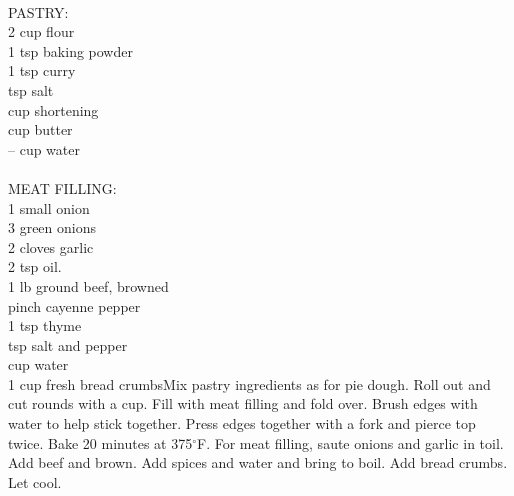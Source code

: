 \begin{minipage}{\linewidth}
\end{minipage}\par\begin{minipage}{\linewidth} 
 \\
  \step
	{PASTRY: \\
	 2 cup flour	\\
	 1 tsp baking powder	\\
	 1 tsp curry		\\
	  tsp salt	\\
	  cup shortening		\\
	  cup butter	\\
	 -- cup water	\\
	 \\MEAT FILLING: \\
	 1 small onion \\
	 3 green onions \\
	 2 cloves garlic \\
	 2 tsp oil. \\
   1 lb ground beef, browned	 \\
	 pinch cayenne pepper \\
	 1 tsp thyme	 \\
	  tsp salt and pepper \\
	  cup water \\
	 1 cup fresh bread crumbs}{Mix pastry ingredients as for pie dough. Roll out and cut rounds with a cup. Fill with meat filling and fold over. Brush edges with water to help stick together. Press edges together with a fork and pierce top twice. Bake 20 minutes at 375$^\circ$F. For meat filling, saute onions and garlic in toil. Add beef and brown. Add spices and water and bring to boil. Add bread crumbs. Let cool.}


\end{minipage}
